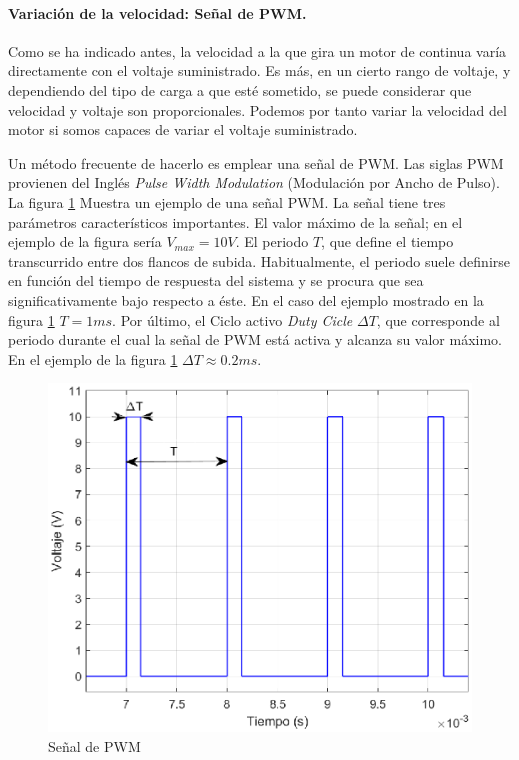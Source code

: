 \documentclass[10pt,a4paper]{report}
\begin{document}
\paragraph{Variación de la velocidad: Señal de PWM.}
Como se ha indicado antes, la velocidad a la que gira un motor de continua varía directamente con el voltaje suministrado. Es más, en un cierto rango de voltaje, y dependiendo del tipo de carga a que esté sometido, se puede considerar que velocidad y voltaje son proporcionales. Podemos por tanto variar la velocidad del motor si somos capaces de variar el voltaje suministrado.

Un método frecuente de hacerlo es emplear una señal de PWM. Las siglas PWM provienen del Inglés \emph{Pulse Width Modulation} (Modulación por Ancho de Pulso). La figura \ref{f9} Muestra un ejemplo de una señal PWM.
La señal tiene tres parámetros característicos importantes. 
El valor máximo de la señal; en el ejemplo de la figura sería $V_{max}=10V$. El periodo $T$, que  define el tiempo transcurrido entre dos flancos de subida. Habitualmente, el periodo suele definirse en función del tiempo de respuesta del sistema y se procura que sea significativamente bajo respecto a éste. En el caso del ejemplo mostrado en la figura \ref{f9} $T=1 ms$. Por último, el Ciclo activo \emph{Duty Cicle} $\Delta T$, que corresponde al periodo durante el cual la señal de PWM está activa y alcanza su valor máximo. En el ejemplo de la figura \ref{f9} $\Delta T\approx 0.2 ms$.

\begin{figure}
\centering
\includegraphics[scale=0.7]{pwm.eps}
\caption{Señal de PWM}\label{f9}
\end{figure} 
\end{document}
